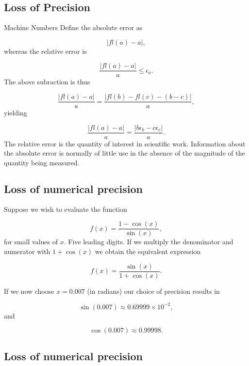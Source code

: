 \documentclass[%
oneside,                 %
final,                   %
10pt]{article}
\begin{document}
\subsection{Loss of Precision}

\begin{block}{Machine Numbers }
Define
the absolute error as

\begin{equation}
   |fl(a)-a|,
\end{equation}
whereas the relative error is

\begin{equation}
   \frac{ |fl(a)-a|}{a} \le \epsilon_a.
\end{equation}
The above subraction is thus

\begin{equation}
   \frac{ |fl(a)-a|}{a}=\frac{ |fl(b)-fl(c)-(b-c)|}{a},
\end{equation}
yielding

\begin{equation}
   \frac{ |fl(a)-a|}{a}=\frac{ |b\epsilon_b- c\epsilon_c|}{a}.
\end{equation}
The relative error
is the quantity of interest in scientific work. Information about the
absolute error is normally of little use in the absence of the magnitude
of the quantity being measured.
\end{block}

\subsection{Loss of numerical precision}

Suppose we wish to evaluate the function

\[
   f(x)=\frac{1-\cos(x)}{\sin(x)},
\]
for small values of $x$. Five leading digits. If we multiply the denominator and numerator
with $1+\cos(x)$ we obtain the equivalent expression

\[
   f(x)=\frac{\sin(x)}{1+\cos(x)}.
\]

If we now choose $x=0.007$ (in radians) our choice of precision results in

\[
   \sin(0.007)\approx 0.69999\times 10^{-2},
\]
and

\[
   \cos(0.007)\approx 0.99998.
\]

\subsection{Loss of numerical precision}
\end{document}
